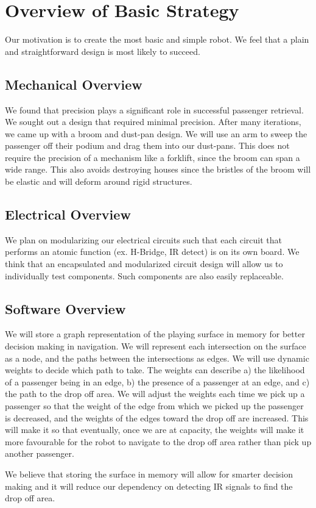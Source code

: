 \documentclass[12pt]{article}
\begin{document}
\section{Overview of Basic Strategy}
\par Our motivation is to create the most basic and simple robot.  We feel that a plain and straightforward design is most likely to succeed.
\subsection{Mechanical Overview}
\par We found that precision plays a significant role in successful passenger retrieval. We sought out a design that required minimal precision.  After many iterations, we came up with a broom and dust-pan design.  We will use an arm to sweep the passenger off their podium and drag them into our dust-pans.  This does not require the precision of a mechanism like a forklift, since the broom can span a wide range.  This also avoids destroying houses since the bristles of the broom will be elastic and will deform around rigid structures.
\subsection{Electrical Overview}
\par We plan on modularizing our electrical circuits such that each circuit that performs an atomic function (ex. H-Bridge, IR detect) is on its own board.  We think that an encapsulated and modularized circuit design will allow us to individually test components.  Such components are also easily replaceable.
\subsection{Software Overview}
\par We will store a graph representation of the playing surface in memory for better decision making in navigation.  We will represent each intersection on the surface as a node, and the paths between the intersections as edges.  We will use dynamic weights to decide which path to take.  The weights can describe a) the likelihood of a passenger being in an edge, b) the presence of a passenger at an edge, and c) the path to the drop off area.  We will adjust the weights each time we pick up a passenger so that the weight of the edge from which we picked up the passenger is decreased, and the weights of the edges toward the drop off are increased.  This will make it so that eventually, once we are at capacity, the weights will make it more favourable for the robot to navigate to the drop off area rather than pick up another passenger. \\ \par 
We believe that storing the surface in memory will allow for smarter decision making and it will reduce our dependency on detecting IR signals to find the drop off area. \\
\end{document}
